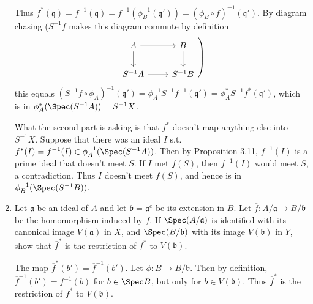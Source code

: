 \begin{questions}
\begin{enumerate}
\begin{solution}
	Thus $f^\ast(\mathfrak{q}) = f^{-1}(\mathfrak{q}) = f^{-1}(\phi _B^{-1}(\mathfrak{q}')) = (\phi_B \circ f)^{-1}(\mathfrak{q}') $.
	By diagram chasing ($S^{-1} f$ makes this diagram commute by definition
	\[
	\left.
		\begin{tikzcd}
			A & B\\
			S^{-1}A & S^{-1}B
			\arrow[from=1-1,to=1-2]
			\arrow[from=1-1,to=2-1]
			\arrow[from=2-1,to=2-2]
			\arrow[from=1-2,to=2-2]
		\end{tikzcd}
	\right)\]
	this equals $(S^{-1}f\circ \phi_A)^{-1}(\mathfrak{q}') = \phi_A^{-1} S^{-1}f^{-1}(\mathfrak{q}') = \phi_A^\ast S^{-1}f^\ast(\mathfrak{q}')$, which is in $\phi_A^\ast(\Spec(S^{-1}A)) = S^{-1}X$.

	What the second part is asking is that $f^\ast $ doesn't map anything else into $S^{-1}X $.
	Suppose that there was an ideal $I $ s.t. $f^\ast(I) = f^{-1}(I) \in \phi_A^{-1}(\Spec(S^{-1}A))$.
	Then by Proposition 3.11, $f^{-1}(I) $ is a prime ideal that doesn't meet $S $.
	If $I $ met $f(S) $, then $f^{-1}(I) $ would meet $S $, a contradiction.
	Thus $I $ doesn't meet $f(S) $, and hence is in $\phi_B^{-1}(\Spec(S^{-1}B)) $.
\end{solution}

\item Let $\mathfrak{a} $ be an ideal of $A $ and let $\mathfrak{b} = \mathfrak{a}^e $ be its extension in $B $.
	Let $\overline{f}:A / \mathfrak{a} \to B / \mathfrak{b}  $ be the homomorphism induced by $f $.
	If $\Spec(A / \mathfrak{a}) $ is identified with its canonical image $V(\mathfrak{a}) $ in $X $, and $\Spec(B / \mathfrak{b}) $ with its image $V(\mathfrak{b}) $ in $Y $, show that $\overline{f}^\ast  $ is the restriction of $f^\ast $ to $V(\mathfrak{b}) $.
\begin{solution}
	The map $\overline{f}^\ast(b') = \overline{f}^{-1}(b')$.
	Let $\phi : B \to B / \mathfrak{b} $.
	Then by definition, $\overline{f}^{-1}(b') = f^{-1}(b)  $ for $b \in \Spec B $, but only for $b \in V(\mathfrak{b})$.
	Thus $\overline{f}^\ast  $ is the restriction of $f^\ast $ to $V(\mathfrak{b}) $.
\end{solution}


\end{enumerate}
\end{questions}
